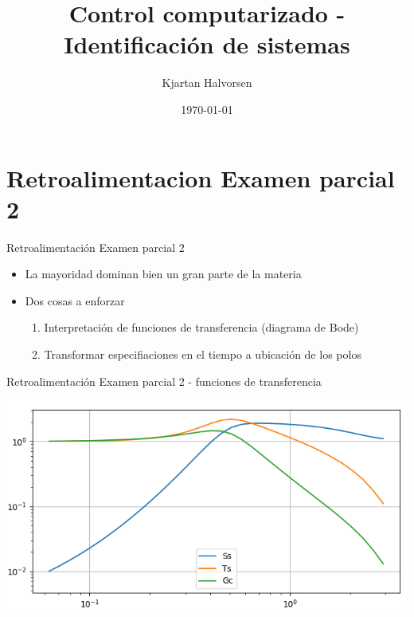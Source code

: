 \documentclass[presentation,aspectratio=169]{beamer}
\author{Kjartan Halvorsen}
\date{\today}
\title{Control computarizado - Identificación de sistemas}
\begin{document}
\maketitle

\section{Retroalimentacion Examen parcial 2}
\label{sec:org6e9979c}

\begin{frame}[label={sec:orgd43548c}]{Retroalimentación Examen parcial 2}
\begin{itemize}
\item La mayoridad dominan bien un gran parte de la materia
\item Dos cosas a enforzar
\begin{enumerate}
\item Interpretación de funciones de transferencia (diagrama de Bode)
\item Transformar especifiaciones en el tiempo a ubicación de los polos
\end{enumerate}
\end{itemize}
\end{frame}

\begin{frame}[label={sec:org41d56fc}]{Retroalimentación Examen parcial 2 - funciones de transferencia}
\begin{center}
\includegraphics[width=0.7\linewidth]{../../figures/sensitivity-fcn-bode-example.png}
\end{center}
\end{frame}
\end{document}
